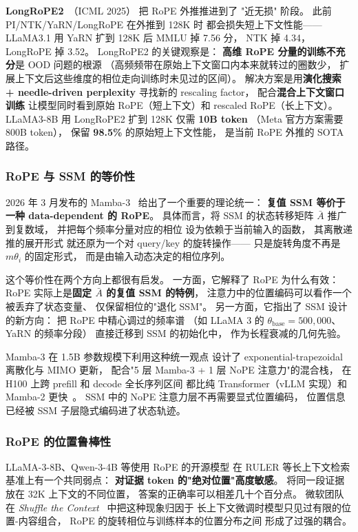 \textbf{LongRoPE2}~\cite{longrope2}（ICML 2025）
把 RoPE 外推推进到了 "近无损" 阶段。
此前 PI/NTK/YaRN/LongRoPE 在外推到 128K 时
都会损失短上下文性能——
LLaMA3.1 用 YaRN 扩到 128K 后 MMLU 掉 7.56 分，
NTK 掉 4.34，LongRoPE 掉 3.52。
LongRoPE2 的关键观察是：
\textbf{高维 RoPE 分量的训练不充分}是 OOD 问题的根源
（高频频带在原始上下文窗口内本来就转过的圈数少，
扩展上下文后这些维度的相位走向训练时未见过的区间）。
解决方案是用\textbf{演化搜索 + needle-driven perplexity}
寻找新的 rescaling factor，
配合\textbf{混合上下文窗口训练}
让模型同时看到原始 RoPE（短上下文）和 rescaled RoPE（长上下文）。
LLaMA3-8B 用 LongRoPE2 扩到 128K 仅需 \textbf{10B token}
（Meta 官方方案需要 800B token），
保留 \textbf{98.5\%} 的原始短上下文性能，
是当前 RoPE 外推的 SOTA 路径。

\subsubsection{RoPE 与 SSM 的等价性}

2026 年 3 月发布的 Mamba-3~\cite{mamba32026}
给出了一个重要的理论统一：
\textbf{复值 SSM 等价于一种 data-dependent 的 RoPE}。
具体而言，将 SSM 的状态转移矩阵 $\bar A$
推广到复数域，
并把每个频率分量对应的相位
设为依赖于当前输入的函数，
其离散递推的展开形式
就还原为一个对 query/key 的旋转操作——
只是旋转角度不再是 $m\theta_i$ 的固定形式，
而是由输入动态决定的相位序列。

这个等价性在两个方向上都很有启发。
一方面，它解释了 RoPE 为什么有效：
RoPE 实际上是\textbf{固定 $\bar A$ 的复值 SSM 的特例}，
注意力中的位置编码可以看作一个被丢弃了状态变量、
仅保留相位的"退化 SSM"。
另一方面，它指出了 SSM 设计的新方向：
把 RoPE 中精心调过的频率谱
（如 LLaMA 3 的 $\theta_{\mathrm{base}}=500{,}000$、
YaRN 的频率分段）
直接迁移到 SSM 的初始化中，
作为长程衰减的几何先验。

Mamba-3 在 1.5B 参数规模下利用这种统一观点
设计了 exponential-trapezoidal 离散化与 MIMO 更新，
配合"5 层 Mamba-3 + 1 层 NoPE 注意力"的混合栈，
在 H100 上跨 prefill 和 decode 全长序列区间
都比纯 Transformer（vLLM 实现）和 Mamba-2 更快~\cite{mamba3hybridtogether2026}。
SSM 中的 NoPE 注意力层不再需要显式位置编码，
位置信息已经被 SSM 子层隐式编码进了状态轨迹。

\subsubsection{RoPE 的位置鲁棒性}

LLaMA-3-8B、Qwen-3-4B 等使用 RoPE 的开源模型
在 RULER 等长上下文检索基准上有一个共同弱点：
\textbf{对证据 token 的"绝对位置"高度敏感}。
将同一段证据放在 32K 上下文的不同位置，
答案的正确率可以相差几十个百分点。
微软团队在
\textit{Shuffle the Context}~\cite{ropePerturbedSelfDistill2026}
中把这种现象归因于
长上下文微调时模型只见过有限的位置-内容组合，
RoPE 的旋转相位与训练样本的位置分布之间
形成了过强的耦合。


